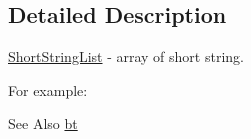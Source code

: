 \subsection{Detailed Description}
\hyperlink{classbt_1_1_short_string_list}{Short\-String\-List} -\/ array of short string. 

For example\-:

\begin{DoxySeeAlso}{See Also}
\hyperlink{namespacebt}{bt} 
\end{DoxySeeAlso}
